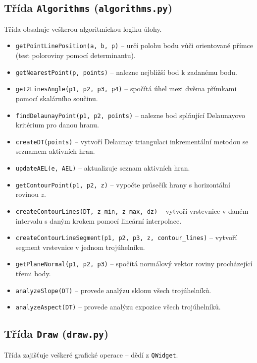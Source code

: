 \documentclass[11pt, a4paper]{article}
\begin{document}
\subsection{Třída \texttt{Algorithms} (\texttt{algorithms.py})}
Třída obsahuje veškerou algoritmickou logiku úlohy.

\begin{itemize}
\item \texttt{getPointLinePosition(a, b, p)} -- určí polohu bodu vůči orientované přímce (test poloroviny pomocí determinantu).
\item \texttt{getNearestPoint(p, points)} -- nalezne nejbližší bod k zadanému bodu.
\item \texttt{get2LinesAngle(p1, p2, p3, p4)} -- spočítá úhel mezi dvěma přímkami pomocí skalárního součinu.
\item \texttt{findDelaunayPoint(p1, p2, points)} -- nalezne bod splňující Delaunayovo kritérium pro danou hranu.
\item \texttt{createDT(points)} -- vytvoří Delaunay triangulaci inkrementální metodou se seznamem aktivních hran.
\item \texttt{updateAEL(e, AEL)} -- aktualizuje seznam aktivních hran.
\item \texttt{getContourPoint(p1, p2, z)} -- vypočte průsečík hrany s horizontální rovinou $z$.
\item \texttt{createContourLines(DT, z\_min, z\_max, dz)} -- vytvoří vrstevnice v daném intervalu s daným krokem pomocí lineární interpolace.
\item \texttt{createContourLineSegment(p1, p2, p3, z, contour\_lines)} -- vytvoří segment vrstevnice v jednom trojúhelníku.
\item \texttt{getPlaneNormal(p1, p2, p3)} -- spočítá normálový vektor roviny procházející třemi body.
\item \texttt{analyzeSlope(DT)} -- provede analýzu sklonu všech trojúhelníků.
\item \texttt{analyzeAspect(DT)} -- provede analýzu expozice všech trojúhelníků.
\end{itemize}

\subsection{Třída \texttt{Draw} (\texttt{draw.py})}
Třída zajišťuje veškeré grafické operace -- dědí z \texttt{QWidget}.
\end{document}

